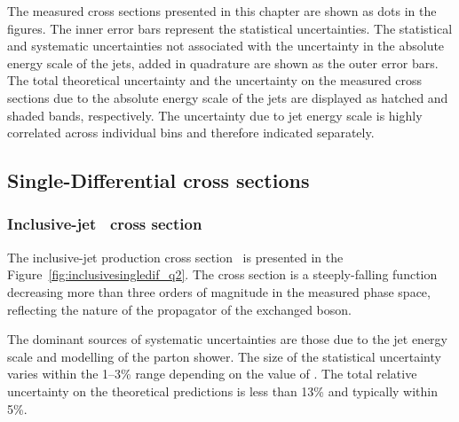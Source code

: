 The measured cross sections presented in this chapter are shown as dots in the figures. The inner error bars represent the statistical uncertainties. The statistical and systematic uncertainties not associated with the uncertainty in the absolute energy scale of the jets, added in quadrature are shown as the outer error bars. The total theoretical uncertainty and the uncertainty on the measured cross sections due to the absolute energy scale of the jets are displayed as hatched and shaded bands, respectively. The uncertainty due to jet energy scale is highly correlated across individual bins and therefore indicated separately.

\subsection{Single-Differential cross sections}
\subsubsection*{Inclusive-jet \dsdqsq~cross section}
The inclusive-jet production cross section \dsdqsq~is presented in the Figure~\ref{fig:inclusivesingledif_q2}. The cross section is a steeply-falling function decreasing more than three orders of magnitude in the measured phase space, reflecting the nature of the propagator of the exchanged boson.

The dominant sources of systematic uncertainties are those due to the jet energy scale and modelling of the parton shower. The size of the statistical uncertainty varies within the 1--3\% range depending on the value of \qsq. %
The total relative uncertainty on the theoretical predictions is less than 13\% and typically within 5\%. %

